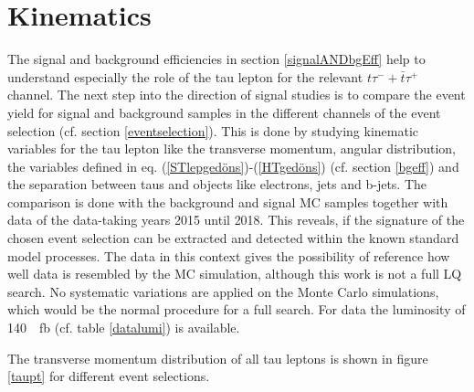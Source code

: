 \section{Kinematics}\label{Kinematics}
The signal and background efficiencies in section \ref{signalANDbgEff} help to understand especially the role of the tau lepton for the relevant $t\tau^{-}+\bar{t}\tau^{+}$ channel. The next step into the direction of signal studies is to compare the event yield for signal and background samples in the different channels of the event selection (cf. section \ref{eventselection}). This is done by studying kinematic variables for the tau lepton like the transverse momentum, angular distribution, the variables defined in eq. (\ref{STlepgedöns})-(\ref{HTgedöns}) (cf. section \ref{bgeff}) and the separation between taus and objects like electrons, jets and b-jets. The comparison is done with the background and signal MC samples together with data of the data-taking years 2015 until 2018. This reveals, if the signature of the chosen event selection can be extracted and detected within the known standard model processes. The data in this context gives the possibility of reference how well data is resembled by the MC simulation, although this work is not a full LQ search. No systematic variations are applied on the Monte Carlo simulations, which would be the normal procedure for a full search. For data the luminosity of \SI{140}{\per\femto\barn} (cf. table \ref{datalumi}) is available.\par
The transverse momentum distribution of all tau leptons is shown in figure \ref{taupt} for different event selections.
%
